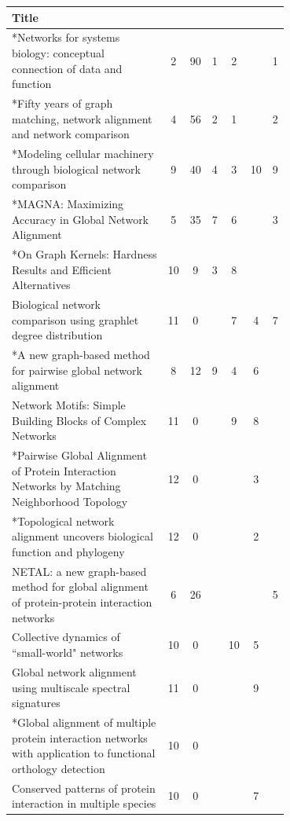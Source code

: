 \documentclass[12pt]{thesis}
\theoremstyle{plain}
\theoremstyle{definition}
\theoremstyle{remark}
\begin{document}
\begin{table}[H]
{\fontsize{10.5}{13}\selectfont
\begin{tabular}{|L{0.7\linewidth}|c|c|c|c|c|c|}
\hline
Title &  &   &  &   &   &  \\ \hline\hline
*Networks for systems biology: conceptual connection of data and function & 2 & 90 & 1 & 2 &  & 1 \\ \hline
*Fifty years of graph matching, network alignment and network comparison & 4 & 56 & 2 & 1 &  & 2 \\ \hline
*Modeling cellular machinery through biological network comparison & 9 & 40 & 4 & 3 & 10 & 9 \\ \hline
*MAGNA: Maximizing Accuracy in Global Network Alignment & 5 & 35 & 7 & 6 &  & 3 \\ \hline
*On Graph Kernels: Hardness Results and Efficient Alternatives & 10 & 9 & 3 & 8 &  &  \\ \hline
Biological network comparison using graphlet degree distribution & 11 & 0 &  & 7 & 4 & 7 \\ \hline
*A new graph-based method for pairwise global network alignment & 8 & 12 & 9 & 4 & 6 &  \\ \hline
Network Motifs: Simple Building Blocks of Complex Networks & 11 & 0 &  & 9 & 8 &  \\ \hline
*Pairwise Global Alignment of Protein Interaction Networks by Matching Neighborhood Topology & 12 & 0 &  &  & 3 &  \\ \hline
*Topological network alignment uncovers biological function and phylogeny & 12 & 0 &  &  & 2 &  \\ \hline
NETAL: a new graph-based method for global alignment of protein-protein interaction networks & 6 & 26 &  &  &  & 5 \\ \hline
Collective dynamics of ``small-world" networks & 10 & 0 &  & 10 & 5 &  \\ \hline
Global network alignment using multiscale spectral signatures & 11 & 0 &  &  & 9 &  \\ \hline
*Global alignment of multiple protein interaction networks with application to functional orthology detection & 10 & 0 &  &  &  &  \\ \hline
Conserved patterns of protein interaction in multiple species & 10 & 0 &  &  & 7 &  \\ \hline

\end{tabular}}
\end{table}
\end{document}
